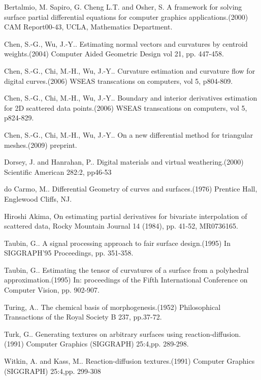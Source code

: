 \documentclass{elsart}
\begin{document}
\begin{thebibliography}{00}

 Bertalmio, M. Sapiro, G. Cheng L.T. and Osher, S. A
framework for solving surface partial differential equations for
computer graphics applications.(2000) CAM Report00-43, UCLA,
Mathematics Department.

 Chen, S.-G., Wu, J.-Y.. Estimating normal vectors and
curvatures by centroid weights.(2004) Computer Aided Geometric
Design vol 21, pp. 447-458.

 Chen, S.-G., Chi, M.-H., Wu, J.-Y.. Curvature
estimation and curvature flow for digital curves.(2006) WSEAS
transcations on computers, vol 5, p804-809.

 Chen, S.-G., Chi, M.-H., Wu, J.-Y.. Boundary and interior
derivatives estimation for 2D scattered data points.(2006) WSEAS
transcations on computers, vol 5, p824-829.

 Chen, S.-G., Chi, M.-H., Wu, J.-Y.. On a new differential method for triangular
meshes.(2009) preprint.



 Dorsey, J. and Hanrahan, P.. Digital materials and virtual
weathering.(2000) Scientific American 282:2, pp46-53


 do Carmo, M.. Differential Geometry of curves and
surfaces.(1976) Prentice Hall, Englewood Cliffs, NJ.

 Hiroshi Akima, On estimating partial derivatives for bivariate interpolation of
scattered data, Rocky Mountain Journal 14 (1984), pp. 41-52,
MR0736165.


 Taubin, G.. A signal processing approach to fair surface
design.(1995) In SIGGRAPH'95 Proceedings, pp. 351-358.


 Taubin, G.. Estimating the tensor of curvatures of a
surface from a polyhedral approximation.(1995) In: proceedings of
the Fifth International Conference on Computer Vision, pp. 902-907.


 Turing, A.. The chemical basis of
morphogenesis.(1952) Philosophical Transactions of the Royal Society
B 237, pp.37-72.

 Turk, G.. Generating textures on arbitrary surfaces using
reaction-diffusion.(1991) Computer Graphics (SIGGRAPH) 25:4,pp.
289-298.

 Witkin, A. and Kass, M.. Reaction-diffusion
textures.(1991) Computer Graphics (SIGGRAPH) 25:4,pp. 299-308



\end{thebibliography}
\end{document}
